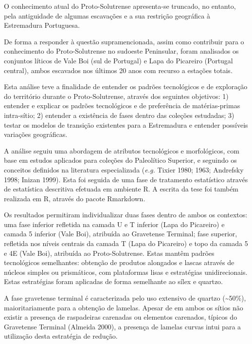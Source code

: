 \documentclass[12pt,twoside]{reedthesis}
\begin{document}
\begin{resumo}
    O conhecimento atual do Proto-Solutrense apresenta-se truncado, no entanto, pela antiguidade de algumas escavações e a sua restrição geográfica à Estremadura Portuguesa.
    
    De forma a responder à questão supramencionada, assim como contribuir para o conhecimento do Proto-Solutrense no sudoeste Peninsular, foram analisados os conjuntos líticos de Vale Boi (sul de Portugal) e Lapa do Picareiro (Portugal central), ambos escavados nos últimos 20 anos com recurso a estações totais.
    
    Esta análise teve a finalidade de entender os padrões tecnológicos e de exploração do território durante o Proto-Solutrense, através dos seguintes objetivos: 1) entender e explicar os padrões tecnológicos e de preferência de matérias-primas intra-sítio; 2) entender a existência de fases dentro das coleções estudadas; 3) testar os modelos de transição existentes para a Estremadura e entender possíveis variações geográficas.
    
    A análise seguiu uma abordagem de atributos tecnológicos e morfológicos, com base em estudos aplicados para coleções do Paleolítico Superior, e seguindo os conceitos definidos na literatura especializada (\emph{e.g.} Tixier 1980; 1963; Andrefsky 1998; Inizan 1999). Esta foi seguida de uma fase de tratamento estatístico através de estatística descritiva efetuada em ambiente R. A escrita da tese foi também realizada em R, através do pacote Rmarkdown.
    
    Os resultados permitiram individualizar duas fases dentro de ambos os contextos: uma fase inferior refletida na camada U e T inferior (Lapa do Picareiro) e camada 5 inferior (Vale Boi), atribuída ao Gravetense Terminal; fase superior, refletida nos níveis centrais da camada T (Lapa do Picareiro) e topo da camada 5 e 4E (Vale Boi), atribuída ao Proto-Solutrense. Estas mantêm padrões tecnológicos semelhantes: obtenção de produtos alongados e lascas através de núcleos simples ou prismáticos, com plataformas lisas e estratégias unidirecionais. Estas estratégias foram aplicadas de forma semelhante ao sílex e quartzo.
    
    A fase gravetense terminal é caracterizada pelo uso extensivo de quartzo (\textasciitilde50\%), maioritariamente para a obtenção de lamelas. Apesar de em ambos os sítios não existir a presença de raspadeiras carenadas ou elementos carenados, típicos do Gravetense Terminal (Almeida 2000), a presença de lamelas curvas intui para a utilização desta estratégia de redução.
    

\end{resumo}
\end{document}
